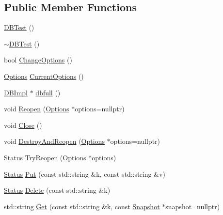 \subsection*{Public Member Functions}
\begin{DoxyCompactItemize}
\item 
\mbox{\hyperlink{classleveldb_1_1_d_b_test_afc6fc9512e900de6ee10c5db15b22930}{D\+B\+Test}} ()
\item 
\mbox{\hyperlink{classleveldb_1_1_d_b_test_a2268045d59c3a74bba03877819e36b55}{$\sim$\+D\+B\+Test}} ()
\item 
bool \mbox{\hyperlink{classleveldb_1_1_d_b_test_a587534fe403016f15cf1997ef7a40836}{Change\+Options}} ()
\item 
\mbox{\hyperlink{structleveldb_1_1_options}{Options}} \mbox{\hyperlink{classleveldb_1_1_d_b_test_a68db410e16195a3b67822bec05c06547}{Current\+Options}} ()
\item 
\mbox{\hyperlink{classleveldb_1_1_d_b_impl}{D\+B\+Impl}} $\ast$ \mbox{\hyperlink{classleveldb_1_1_d_b_test_a67de35d247ea077c1e4fdf2a7a0f0514}{dbfull}} ()
\item 
void \mbox{\hyperlink{classleveldb_1_1_d_b_test_a09189633fd9c14d487685c3c400b5ccc}{Reopen}} (\mbox{\hyperlink{structleveldb_1_1_options}{Options}} $\ast$options=nullptr)
\item 
void \mbox{\hyperlink{classleveldb_1_1_d_b_test_aee76446bbb9c34cdb1ae00318689aead}{Close}} ()
\item 
void \mbox{\hyperlink{classleveldb_1_1_d_b_test_a3ccf08a024e805e70b723887e6dbfdae}{Destroy\+And\+Reopen}} (\mbox{\hyperlink{structleveldb_1_1_options}{Options}} $\ast$options=nullptr)
\item 
\mbox{\hyperlink{classleveldb_1_1_status}{Status}} \mbox{\hyperlink{classleveldb_1_1_d_b_test_aee588b2d13db6be2a651a8fabeac5c79}{Try\+Reopen}} (\mbox{\hyperlink{structleveldb_1_1_options}{Options}} $\ast$options)
\item 
\mbox{\hyperlink{classleveldb_1_1_status}{Status}} \mbox{\hyperlink{classleveldb_1_1_d_b_test_a5ec1a1d5ecc1744f325159eb81e46514}{Put}} (const std\+::string \&k, const std\+::string \&v)
\item 
\mbox{\hyperlink{classleveldb_1_1_status}{Status}} \mbox{\hyperlink{classleveldb_1_1_d_b_test_a25716ec93d525adbeea8ff71e8f3a9f4}{Delete}} (const std\+::string \&k)
\item 
std\+::string \mbox{\hyperlink{classleveldb_1_1_d_b_test_a99cd7b06d51f5c854da152a6419bff5c}{Get}} (const std\+::string \&k, const \mbox{\hyperlink{classleveldb_1_1_snapshot}{Snapshot}} $\ast$snapshot=nullptr)

\end{DoxyCompactItemize}
